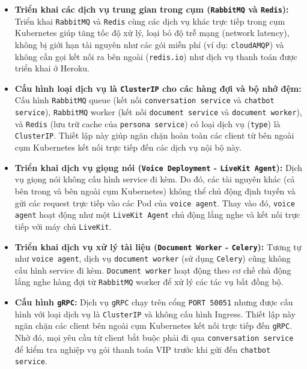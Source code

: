 \begin{itemize}
\item \textbf{Triển khai các dịch vụ trung gian trong cụm (\texttt{RabbitMQ} và \texttt{Redis}):}
Triển khai \texttt{RabbitMQ} và \texttt{Redis} cùng các dịch vụ khác trực tiếp trong cụm Kubernetes giúp tăng tốc độ xử lý, loại bỏ độ trễ mạng (network latency), không bị giới hạn tài nguyên như các gói miễn phí (ví dụ: \texttt{cloudAMQP}) và không cần gọi kết nối ra bên ngoài (\texttt{redis.io}) như dịch vụ thanh toán được triển khai ở Heroku.


\item \textbf{Cấu hình loại dịch vụ là \texttt{ClusterIP} cho các hàng đợi và bộ nhớ đệm:}
Cấu hình \texttt{RabbitMQ} queue (kết nối \texttt{conversation service} và \texttt{chatbot service}), \texttt{RabbitMQ} worker (kết nối \texttt{document service} và \texttt{document worker}), và \texttt{Redis} (lưu trữ cache của \texttt{persona service}) có loại dịch vụ (\texttt{type}) là \texttt{ClusterIP}. Thiết lập này giúp ngăn chặn hoàn toàn các client từ bên ngoài cụm Kubernetes kết nối trực tiếp đến các dịch vụ nội bộ này.

\item \textbf{Triển khai dịch vụ giọng nói (\texttt{Voice Deployment} - \texttt{LiveKit Agent}):}
Dịch vụ giọng nói không cấu hình service đi kèm. Do đó, các tài nguyên khác (cả bên trong và bên ngoài cụm Kubernetes) không thể chủ động định tuyến và gửi các request trực tiếp vào các Pod của \texttt{voice agent}. Thay vào đó, \texttt{voice agent} hoạt động như một \texttt{LiveKit Agent} chủ động lắng nghe và kết nối trực tiếp với máy chủ \texttt{LiveKit}.

\item \textbf{Triển khai dịch vụ xử lý tài liệu (\texttt{Document Worker} - \texttt{Celery}):}
Tương tự như \texttt{voice agent}, dịch vụ \texttt{document worker} (sử dụng \texttt{Celery}) cũng không cấu hình service đi kèm. \texttt{Document worker} hoạt động theo cơ chế chủ động lắng nghe hàng đợi từ \texttt{RabbitMQ} worker để xử lý các tác vụ bất đồng bộ.

\item \textbf{Cấu hình \texttt{gRPC}:}
Dịch vụ \texttt{gRPC} chạy trên cổng \texttt{PORT 50051} nhưng được cấu hình với loại dịch vụ là \texttt{ClusterIP} và không cấu hình Ingress. Thiết lập này ngăn chặn các client bên ngoài cụm Kubernetes kết nối trực tiếp đến \texttt{gRPC}. Nhờ đó, mọi yêu cầu từ client bắt buộc phải đi qua \texttt{conversation service} để kiểm tra nghiệp vụ gói thanh toán VIP trước khi gửi đến \texttt{chatbot service}.
\end{itemize}


